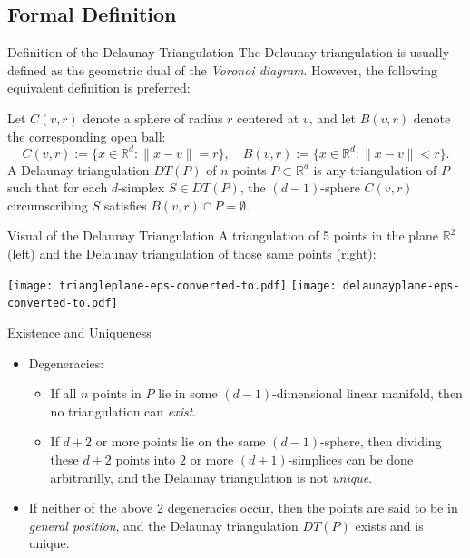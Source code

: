 \documentclass[xcolor=dvipsnames]{beamer}
\begin{document}
\subsection{Formal Definition}
\begin{frame}{Definition of the Delaunay Triangulation}
The Delaunay triangulation is usually defined as the geometric dual of the
{\it Voronoi diagram}.
However, the following equivalent definition is preferred:
\begin{definition}
Let $C(v,r)$ denote a sphere of radius $r$ centered at $v$,
and let $B(v,r)$ denote the corresponding open ball: 
$$C(v,r):=\{x\in\mathbb{R}^d : \|x-v\|=r\}, \quad
B(v,r):=\{x\in\mathbb{R}^d:\|x-v\|<r\}.$$
A Delaunay triangulation $DT(P)$ of $n$ points $P \subset \mathbb{R}^d$ is any 
triangulation of $P$ such that for each
$d$-simplex $S\in DT(P)$, the $(d-1)$-sphere $C(v,r)$ circumscribing $S$
satisfies $B(v,r) \cap P = \emptyset$.
\end{definition}
\end{frame}
\begin{frame}{Visual of the Delaunay Triangulation}
A triangulation of 5 points in the plane $\mathbb{R}^2$ (left) and the
Delaunay triangulation of those same points (right):\\
\begin{center}
\texttt{[image: triangleplane-eps-converted-to.pdf]}
\texttt{[image: delaunayplane-eps-converted-to.pdf]}
\end{center}
\end{frame}
\begin{frame}{Existence and Uniqueness}
\begin{itemize}
\item Degeneracies:
\begin{itemize}
\item If all $n$ points in $P$ lie in some $(d-1)$-dimensional linear manifold,
then no triangulation can {\it exist}.
\item If $d+2$ or more points lie on the same $(d-1)$-sphere, then dividing
these $d+2$ points into $2$ or more $(d+1)$-simplices can be done arbitrarilly,
and the Delaunay triangulation is not {\it unique}.
\end{itemize}
\item If neither of the above 2 degeneracies occur, then the points are said
to be in {\it general position}, and the Delaunay triangulation $DT(P)$ exists
and is unique.
\end{itemize}
\end{frame}
\end{document}
